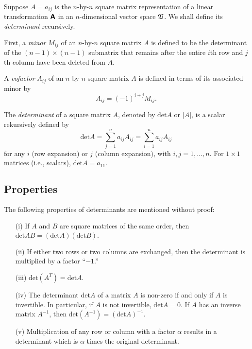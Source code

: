 Suppose $A=a_{ij}$ is the  $n$-by-$n$ square matrix representation of
a linear transformation $\textsf{\textbf{A}}$
in an $n$-dimensional vector space ${\frak V}$.
We shall define its {\em determinant} recursively.

First,
a {\em minor}
$M_{ij}$ of an  $n$-by-$n$ square matrix  $A$ is
defined to be the determinant of the
$(n-1)\times (n-1)$ submatrix
that remains after the entire $i$th row and $j$th column have been deleted from $A$.

A {\em cofactor}
$A_{ij}$
of an $n$-by-$n$ square matrix  $A$
is defined in terms of its associated minor by
\begin{equation}
A_{ij}=(-1)^{i+j}M_{ij}.
\end{equation}

The {\em determinant} of a square matrix $A$, denoted by
$\textrm{det} A$ or $\vert A\vert$, is a scalar rekursively defined by
\begin{equation}
\textrm{det}A
=\sum_{j=1}^n a_{ij}A_{ij}
=\sum_{i=1}^n a_{ij}A_{ij}
\end{equation}
for any $i$ (row expansion) or $j$ (column expansion), with $i,j=1,\ldots ,n$.
For $1\times 1$ matrices (i.e., scalars), $\textrm{det}A =a_{11}$.

\subsection{Properties}

The following properties of determinants are mentioned without proof:

\begin{itemize}
\item[(i)]
If $A$ and $B$ are square matrices of the same order, then
$\textrm{det}AB = (\textrm{det}A)  (\textrm{det}B)$.

\item[(ii)]
If either two rows or two columns are exchanged, then the determinant is multiplied
by a factor ``$-1$.''


\item[(iii)]
$\textrm{det}(A^T) = \textrm{det}A .$

\item[(iv)]
The determinant $\textrm{det}A $ of a matrix $A$ is non-zero if and only if $A$ is invertible.
In particular, if $A$ is not invertible, $\textrm{det}A =0$.
If $A$ has an inverse matrix $A^{-1}$, then $\textrm{det}(A^{-1}) = (\textrm{det}A)^{-1} $.


\item[(v)]
Multiplication of any row or column with a factor $\alpha$  results in a determinant
which is $\alpha$ times the original determinant.
\end{itemize}

